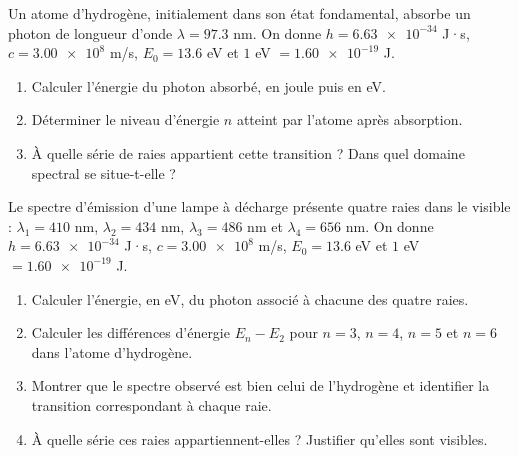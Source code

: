 \documentclass[11pt]{article}
\newcounter{popsec}
\newcounter{popsub}
\newcommand{\courssub}[1]{%
  \stepcounter{popsub}%
  \par\vspace{9pt}\noindent{\popxbold\fontsize{11.5}{13}\selectfont\color{popink}{\color{poporange}\thepopsec.\thepopsub}\hspace{6pt}#1}\par\nopagebreak\vspace{4pt}
}
\begin{document}
\begin{exercice}
Un atome d'hydrogène, initialement dans son état fondamental, absorbe un photon de longueur d'onde $\lambda = \num{97,3}$ nm. On donne $h = \num{6,63e-34}$ J·s, $c = \num{3,00e8}$ m/s, $E_0 = \num{13,6}$ eV et $\num{1}$ eV $= \num{1,60e-19}$ J.
\begin{enumerate}
\item Calculer l'énergie du photon absorbé, en joule puis en eV.
\item Déterminer le niveau d'énergie $n$ atteint par l'atome après absorption.
\item À quelle série de raies appartient cette transition ? Dans quel domaine spectral se situe-t-elle ?
\end{enumerate}
\end{exercice}

\begin{exercice}
Le spectre d'émission d'une lampe à décharge présente quatre raies dans le visible : $\lambda_1 = \num{410}$ nm, $\lambda_2 = \num{434}$ nm, $\lambda_3 = \num{486}$ nm et $\lambda_4 = \num{656}$ nm. On donne $h = \num{6,63e-34}$ J·s, $c = \num{3,00e8}$ m/s, $E_0 = \num{13,6}$ eV et $\num{1}$ eV $= \num{1,60e-19}$ J.
\begin{enumerate}
\item Calculer l'énergie, en eV, du photon associé à chacune des quatre raies.
\item Calculer les différences d'énergie $E_n - E_2$ pour $n = 3$, $n = 4$, $n = 5$ et $n = 6$ dans l'atome d'hydrogène.
\item Montrer que le spectre observé est bien celui de l'hydrogène et identifier la transition correspondant à chaque raie.
\item À quelle série ces raies appartiennent-elles ? Justifier qu'elles sont visibles.
\end{enumerate}
\end{exercice}

\courssub{Je me prépare au Bac}
\end{document}
